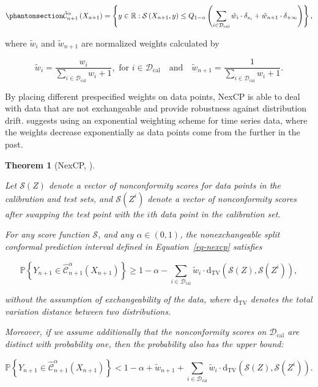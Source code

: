 \documentclass[
  11pt,
  a4paper,
]{article}
\theoremstyle{plain}
\newtheorem{theorem}{Theorem}[section]
\theoremstyle{plain}
\theoremstyle{remark}
\begin{document}
\begin{equation}\phantomsection\label{eq-nexcp}{
\hat{\mathcal{C}}_{n+1}^{\alpha}\left(X_{n+1}\right) = \left\{y\in\mathbb{R}: \mathcal{S}\left(X_{n+1}, y\right) \leq Q_{1-\alpha}\left(\sum_{i \in \mathcal{D}_{\text{cal}}}\tilde{w}_i\cdot\delta_{s_{i}}+\tilde{w}_{n+1}\cdot\delta_{+\infty}\right)\right\},
}\end{equation}

where \(\tilde{w}_i\) and \(\tilde{w}_{n+1}\) are normalized weights
calculated by

\[
\tilde{w}_i = \frac{w_i}{\sum_{i\in\mathcal{D}_{\text{cal}}}w_i+1}, \text{ for } i \in \mathcal{D}_{\text{cal}} \quad \text{and} \quad \tilde{w}_{n+1} =  \frac{1}{\sum_{i\in\mathcal{D}_{\text{cal}}}w_i+1}.
\]

By placing different prespecified weights on data points, NexCP is able
to deal with data that are not exchangeable and provide robustness
against distribution drift. \textcite{barber2023} suggests using an
exponential weighting scheme for time series data, where the weights
decrease exponentially as data points come from the further in the past.

\begin{theorem}[NexCP,
\textcite{barber2023}]\protect\hypertarget{thm-nexcp}{}\label{thm-nexcp}

Let \(\mathcal{S}(Z)\) denote a vector of nonconformity scores for data
points in the calibration and test sets, and \(\mathcal{S}(Z^i)\) denote
a vector of nonconformity scores after swapping the test point with the
\(i\)th data point in the calibration set.

For any score function \(\mathcal{S}\), and any \(\alpha\in(0,1)\), the
nonexchangeable split conformal prediction interval defined in
Equation~\ref{eq-nexcp} satisfies

\[
\mathbb{P}\left\{Y_{n+1} \in \hat{\mathcal{C}}_{n+1}^{\alpha}\left(X_{n+1}\right)\right\} \geq 1-\alpha-\sum_{i \in \mathcal{D}_{\text{cal}}} \tilde{w}_i \cdot \mathrm{d}_{\mathrm{TV}}\left(\mathcal{S}(Z), \mathcal{S}\left(Z^i\right)\right),
\]

without the assumption of exchangeability of the data, where
\(\mathrm{d}_{\mathrm{TV}}\) denotes the total variation distance
between two distributions.

Moreover, if we assume additionally that the nonconformity scores on
\(\mathcal{D}_{\text{cal}}\) are distinct with probability one, then the
probability also has the upper bound:

\[
\mathbb{P}\left\{Y_{n+1} \in \hat{\mathcal{C}}_{n+1}^{\alpha}\left(X_{n+1}\right)\right\} < 1-\alpha+\tilde{w}_{n+1}+\sum_{i \in \mathcal{D}_{\text{cal}}} \tilde{w}_i \cdot \mathrm{d}_{\mathrm{TV}}\left(\mathcal{S}(Z), \mathcal{S}\left(Z^i\right)\right).
\]

\end{theorem}
\end{document}
